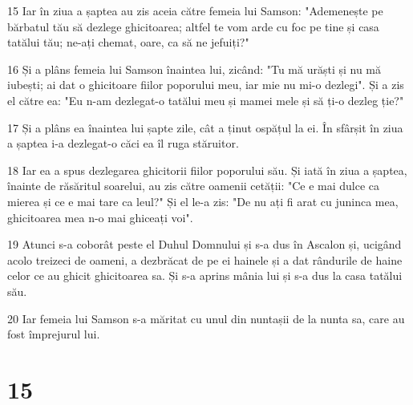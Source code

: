 \par 15 Iar în ziua a șaptea au zis aceia către femeia lui Samson: "Ademenește pe bărbatul tău să dezlege ghicitoarea; altfel te vom arde cu foc pe tine și casa tatălui tău; ne-ați chemat, oare, ca să ne jefuiți?"
\par 16 Și a plâns femeia lui Samson înaintea lui, zicând: "Tu mă urăști și nu mă iubești; ai dat o ghicitoare fiilor poporului meu, iar mie nu mi-o dezlegi". Și a zis el către ea: "Eu n-am dezlegat-o tatălui meu și mamei mele și să ți-o dezleg ție?"
\par 17 Și a plâns ea înaintea lui șapte zile, cât a ținut ospățul la ei. În sfârșit în ziua a șaptea i-a dezlegat-o căci ea îl ruga stăruitor.
\par 18 Iar ea a spus dezlegarea ghicitorii fiilor poporului său. Și iată în ziua a șaptea, înainte de răsăritul soarelui, au zis către oamenii cetății: "Ce e mai dulce ca mierea și ce e mai tare ca leul?" Și el le-a zis: "De nu ați fi arat cu juninca mea, ghicitoarea mea n-o mai ghiceați voi".
\par 19 Atunci s-a coborât peste el Duhul Domnului și s-a dus în Ascalon și, ucigând acolo treizeci de oameni, a dezbrăcat de pe ei hainele și a dat rândurile de haine celor ce au ghicit ghicitoarea sa. Și s-a aprins mânia lui și s-a dus la casa tatălui său.
\par 20 Iar femeia lui Samson s-a măritat cu unul din nuntașii de la nunta sa, care au fost împrejurul lui.

\chapter{15}


